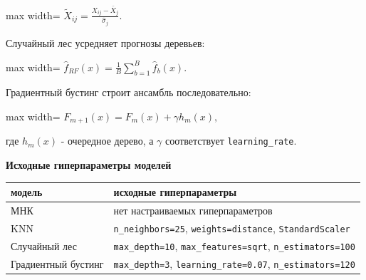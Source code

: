 \documentclass[11pt]{article}
\newcounter{none}
\begin{document}
\begin{center}
\begin{adjustbox}{max width=\linewidth}
\(\displaystyle \tilde X_{ij} = \frac{X_{ij} - \bar X_j}{\hat\sigma_j}.\)
\end{adjustbox}
\end{center}

Случайный лес усредняет прогнозы деревьев:

\begin{center}
\begin{adjustbox}{max width=\linewidth}
\(\displaystyle \hat f_{RF}(x) = \frac{1}{B}\sum_{b=1}^{B}\hat f_b(x).\)
\end{adjustbox}
\end{center}

Градиентный бустинг строит ансамбль последовательно:

\begin{center}
\begin{adjustbox}{max width=\linewidth}
\(\displaystyle F_{m+1}(x) = F_m(x) + \gamma h_m(x),\)
\end{adjustbox}
\end{center}

где \(h_m(x)\) - очередное дерево, а \(\gamma\) соответствует
\texttt{learning\_rate}.

    \textbf{Исходные гиперпараметры моделей}

{\def\LTcaptype{none} %
\begin{longtable}[]{@{}
  >{\raggedright\arraybackslash}p{}
  >{\raggedright\arraybackslash}p{}@{}}
\toprule\noalign{}
\begin{minipage}[b]{\linewidth}\raggedright
модель
\end{minipage} & \begin{minipage}[b]{\linewidth}\raggedright
исходные гиперпараметры
\end{minipage} \\
\midrule\noalign{}
\endhead
\bottomrule\noalign{}
\endlastfoot
МНК & нет настраиваемых гиперпараметров \\
KNN & \texttt{n\_neighbors=25}, \texttt{weights=distance},
\texttt{StandardScaler} \\
Случайный лес & \texttt{max\_depth=10}, \texttt{max\_features=sqrt},
\texttt{n\_estimators=100} \\
Градиентный бустинг & \texttt{max\_depth=3},
\texttt{learning\_rate=0.07}, \texttt{n\_estimators=120} \\
\end{longtable}
}
\end{document}
